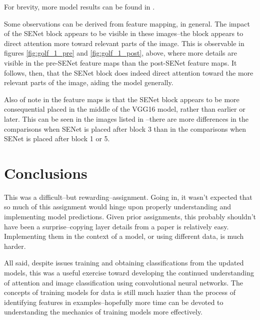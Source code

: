 \documentclass{article}
\begin{document}
\par For brevity, more model results can be found in .
\par Some observations can be derived from feature mapping, in general. 
The impact of the SENet block appears to be visible in these images--the block appears to direct attention more toward relevant parts of the image.
This is observable in figures \ref{fig:golf_1_pre} and \ref{fig:golf_1_post}, above, where more details are visible in the pre-SENet feature maps than the post-SENet feature maps.
It follows, then, that the SENet block does indeed direct attention toward the more relevant parts of the image, aiding the model generally.

\par Also of note in the feature maps is that the SENet block appears to be more consequential placed in the middle of the VGG16 model, rather than earlier or later.
This can be seen in the images listed in --there are more differences in the comparisons when SENet is placed after block 3 than in the comparisons when SENet is placed after block 1 or 5.

\section{Conclusions}
\par This was a difficult--but rewarding--assignment. Going in, it wasn't expected that so much of this assignment would hinge upon properly understanding and implementing model predictions.
Given prior assignments, this probably shouldn't have been a surprise--copying layer details from a paper is relatively easy.
Implementing them in the context of a model, or using different data, is much harder.

\par All said, despite issues training and obtaining classifications from the updated models, this was a useful exercise toward developing the continued understanding of attention and image classification using convolutional neural networks.
The concepts of training models for data is still much hazier than the process of identifying features in examples--hopefully more time can be devoted to understanding the mechanics of training models more effectively.



\end{document}
